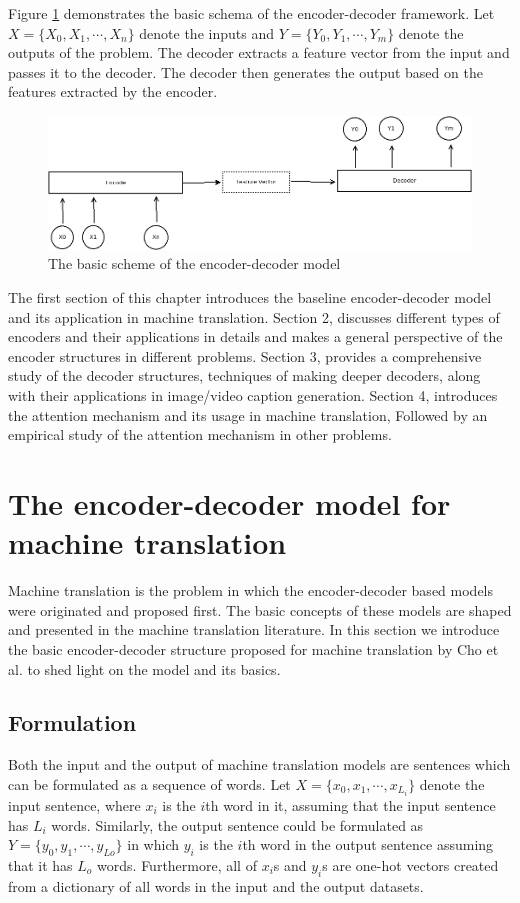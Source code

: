 \documentclass[preprint, 12pt]{elsarticle}
\begin{document}
		Figure \ref{fig:encdec} demonstrates the basic schema of the encoder-decoder framework. Let $X = \{X_0, X_1, \cdots, X_n\}$ denote the inputs and $Y = \{Y_0, Y_1, \cdots, Y_m\}$ denote the outputs of the problem. The decoder extracts a feature vector from the input and passes it to the decoder. The decoder then generates the output based on the features extracted by the encoder.
		\begin{figure}[h]
			\centering
			\includegraphics[scale=0.4]{Imgs/encoder_decoder.png}
			\caption{The basic scheme of the encoder-decoder model}
			\label{fig:encdec}
		\end{figure}
		
		The first section of this chapter introduces the baseline encoder-decoder model and its application in machine translation. Section 2, discusses different types of encoders and their applications in details and makes a general perspective of the encoder structures in different problems. Section 3, provides a comprehensive study of the decoder structures, techniques of making deeper decoders, along with their applications in image/video caption generation. Section 4, introduces the attention mechanism and its usage in machine translation, Followed by an empirical study of the attention mechanism in other problems.
	
	
	\section{The encoder-decoder model for machine translation}
	Machine translation is the problem in which the encoder-decoder based models were originated and proposed first. The basic concepts of these models are shaped and presented in the machine translation literature. In this section we introduce the basic encoder-decoder structure proposed for machine translation by Cho et al. \cite{cho2014learning} to shed light on the model and its basics.
	
		\subsection{Formulation}
		Both the input and the output of machine translation models are sentences which can be formulated as a sequence of words. Let $X = \{x_0, x_1, \cdots, x_{L_{i}}\}$ denote the input sentence, where $x_i$ is the $i$th word in it, assuming that the input sentence has $L_{i}$ words. Similarly, the output sentence could be formulated as $Y = \{y_0, y_1, \cdots, y_{L{o}}\}$ in which $y_i$ is the $i$th word in the output sentence assuming that it has $L_{o}$ words. Furthermore, all of $x_i$s and $y_i$s are one-hot vectors created from a dictionary of all words in the input and the output datasets.
		
\end{document}
